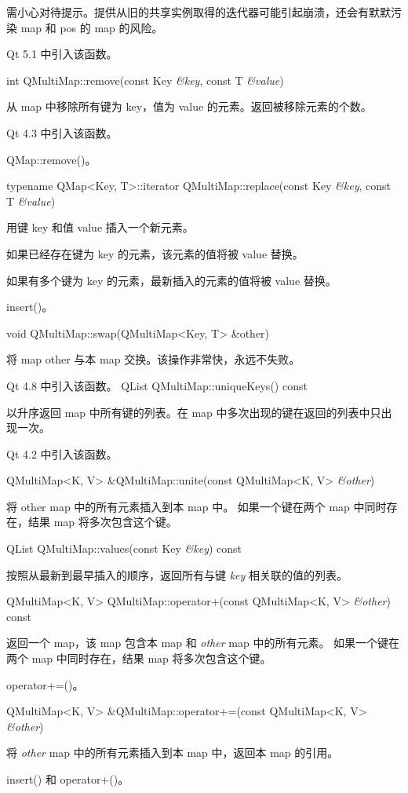 \begin{notice}
需小心对待提示。提供从旧的共享实例取得的迭代器可能引起崩溃，还会有默默污染 map 和 pos 的 map 的风险。
\end{notice}

Qt 5.1 中引入该函数。

int QMultiMap::remove(const Key \emph{\&key}, const T \emph{\&value})

从 map 中移除所有键为 key，值为 value 的元素。返回被移除元素的个数。

Qt 4.3 中引入该函数。

\begin{seeAlso}
QMap::remove()。
\end{seeAlso}

typename QMap<Key, T>::iterator QMultiMap::replace(const Key \emph{\&key}, const T \emph{\&value})

用键 key 和值 value 插入一个新元素。

如果已经存在键为 key 的元素，该元素的值将被 value 替换。

如果有多个键为 key 的元素，最新插入的元素的值将被 value 替换。

\begin{seeAlso}
insert()。
\end{seeAlso}

void QMultiMap::swap(QMultiMap<Key, T> \&other)

将 map other 与本 map 交换。该操作非常快，永远不失败。

Qt 4.8 中引入该函数。
QList QMultiMap::uniqueKeys() const

以升序返回 map 中所有键的列表。在 map 中多次出现的键在返回的列表中只出现一次。

Qt 4.2 中引入该函数。

QMultiMap<K, V> \&QMultiMap::unite(const QMultiMap<K, V> \emph{\&other})

将 other map 中的所有元素插入到本 map 中。
如果一个键在两个 map 中同时存在，结果 map 将多次包含这个键。

\lineHigh

QList QMultiMap::values(const Key \emph{\&key}) const

按照从最新到最早插入的顺序，返回所有与键 \emph{key} 相关联的值的列表。

\lineHigh

QMultiMap<K, V> QMultiMap::operator+(const QMultiMap<K, V> \emph{\&other}) const

返回一个 map，该 map 包含本 map 和 \emph{other} map 中的所有元素。
如果一个键在两个 map 中同时存在，结果 map 将多次包含这个键。

\begin{seeAlso}
operator+=()。
\end{seeAlso}

\lineHigh

QMultiMap<K, V> \&QMultiMap::operator+=(const QMultiMap<K, V> \emph{\&other})

将 \emph{other} map 中的所有元素插入到本 map 中，返回本 map 的引用。

\begin{seeAlso}
insert() 和 operator+()。
\end{seeAlso}